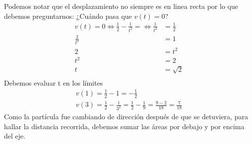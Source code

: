 Podemos notar que el desplazamiento no siempre es en linea recta por lo que debemos preguntarnos: ¿Cuándo pasa que $v(t)=0$?
\begin{align*}
	v(t)=0\iff \frac{1}{2}-\frac{1}{t^2}=\iff \frac{1}{t^2} & =\frac{1}{2} \\
	\frac{2}{t^2}                                           & = 1          \\
	2                                                       & = t^2        \\
	t^2                                                     & = 2          \\
	t                                                       & =\sqrt{2}    \\
\end{align*}
Debemos evaluar t en los límites
\begin{align*}
	v(1)=\frac{1}{2}-1=-\frac{1}{2} \\
	v(3)=\frac{1}{2}-\frac{1}{3^2}=\frac{1}{2}-\frac{1}{9}=\frac{9-2}{18}=\frac{7}{18}
\end{align*}
Como la partícula fue cambiando de dirección después de que se detuviera, para hallar la distancia recorrida, debemos sumar las áreas por debajo y por encima del eje.
